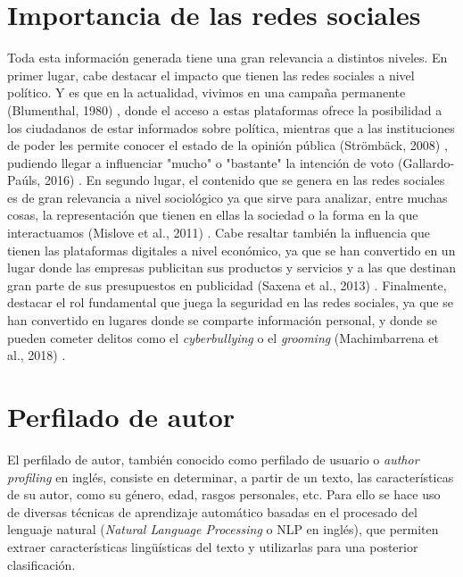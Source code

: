 \section{Importancia de las redes sociales}
\label{sec:intr_importancia}
Toda esta información generada tiene una gran relevancia a distintos niveles. En primer lugar, cabe destacar el impacto que
tienen las redes sociales a nivel político. Y es que en la actualidad, vivimos en una campaña permanente (Blumenthal, 1980)
\cite{sydney1980permanent},
donde el acceso a estas plataformas ofrece la posibilidad a los ciudadanos de estar informados sobre política, mientras que a las instituciones
de poder les permite conocer el estado de la opinión pública (Strömbäck, 2008)
\cite{stromback2008four}, pudiendo llegar a influenciar "mucho" o "bastante" la intención de voto (Gallardo-Paúls, 2016) \cite{gallardo2016pseudopolitica}.
En segundo lugar, el contenido que se genera en las redes sociales es de gran relevancia a nivel sociológico ya que sirve para analizar, entre muchas cosas,
la representación que tienen en ellas la sociedad o la forma en la que interactuamos (Mislove et al., 2011) \cite{mislove2011understanding}. Cabe resaltar también la influencia
que tienen las plataformas digitales a nivel económico, ya que se han convertido en un lugar donde las empresas
publicitan sus productos y servicios y a las que destinan gran parte de sus presupuestos en publicidad
(Saxena et al., 2013) \cite{saxena2013advertising}. Finalmente, destacar el rol fundamental que juega la seguridad en las redes sociales,
ya que se han convertido en lugares donde se comparte información personal, y donde se pueden cometer delitos como
el \textit{cyberbullying} o el \textit{grooming} (Machimbarrena et al., 2018) \cite{machimbarrena2018internet}.

\section{Perfilado de autor}
\label{sec:intro_perfilado}

El perfilado de autor, también conocido como perfilado de usuario o \textit{author profiling} en inglés, consiste en determinar, a partir de un texto,
las características de su autor, como su género, edad, rasgos personales, etc. Para ello se hace uso de diversas técnicas de aprendizaje automático
basadas en el procesado del lenguaje natural (\textit{Natural Language Processing} o NLP en inglés), que permiten extraer características lingüísticas del texto y utilizarlas para una
posterior clasificación.

